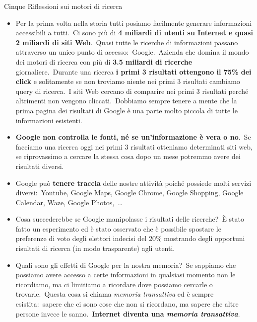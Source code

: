 \noindent Cinque Riflessioni sui motori di ricerca
\begin{itemize}
    \item Per la prima volta nella storia tutti posiamo facilmente generare informazioni accessibili a tutti.\ Ci sono più di \textbf{4 miliardi di utenti su Internet e quasi 2 miliardi di siti Web}.\ Quasi tutte le ricerche di informazioni passano attraverso un unico punto di accesso:\ Google.\ Azienda che domina il mondo dei motori di ricerca con più di \textbf{3.5 miliardi di ricerche} giornaliere.\
          Durante una ricerca \textbf{i primi 3 risultati ottengono il 75\% dei click} e solitamente se non troviamo niente nei primi 3 risultati cambiamo query di ricerca.\ I siti Web cercano di comparire nei primi 3 risultati perché altrimenti non vengono cliccati.\ Dobbiamo sempre tenere a mente che la prima pagina dei risultati di Google è una parte molto piccola di tutte le informazioni esistenti.\
    \item \textbf{Google non controlla le fonti, né se un'informazione è vera o no}.\ Se facciamo una ricerca oggi nei primi 3 risultati otteniamo determinati siti web, se riprovassimo a cercare la stessa cosa dopo un mese potremmo avere dei risultati diversi.
    \item Google può \textbf{tenere traccia} delle nostre attività poiché possiede molti servizi diversi:\ Youtube, Google Maps, Google Chrome, Google Shopping, Google Calendar, Waze, Google Photos,\ \dots
    \item Cosa succederebbe se Google manipolasse i risultati delle ricerche?\ È stato fatto un esperimento ed è stato osservato che è possibile spostare le preferenze di voto degli elettori indecisi del 20\% mostrando degli opportuni risultati di ricerca (in modo trasparente) agli utenti.
    \item Quali sono gli effetti di Google per la nostra memoria?\ Se sappiamo che possiamo avere accesso a certe informazioni in qualsiasi momento non le ricordiamo, ma ci limitiamo a ricordare dove possiamo cercarle o trovarle.\ Questa cosa si chiama \textit{memoria transattiva} ed è sempre esistita:\  sapere che ci sono cose che non si ricordano, ma sapere che altre persone invece le sanno.\ \textbf{Internet diventa una \textit{memoria transattiva}}.
\end{itemize}

